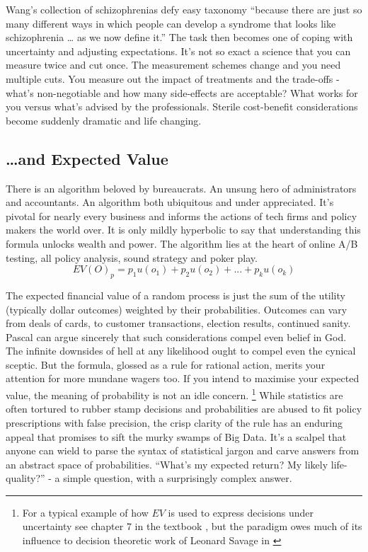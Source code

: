 \documentclass[
]{book}
\theoremstyle{definition}
\theoremstyle{definition}
\theoremstyle{definition}
\theoremstyle{remark}
\begin{document}
Wang's collection of schizophrenias defy easy taxonomy ``because there are just so many different ways in which people can develop a syndrome that looks like schizophrenia \ldots{} as we now define it.'' The task then becomes one of coping with uncertainty and adjusting expectations. It's not so exact a science that you can measure twice and cut once. The measurement schemes change and you need multiple cuts. You measure out the impact of treatments and the trade-offs - what's non-negotiable and how many side-effects are acceptable? What works for you versus what's advised by the professionals. Sterile cost-benefit considerations become suddenly dramatic and life changing.

\hypertarget{and-expected-value}{%
\subsection{\ldots and Expected Value}\label{and-expected-value}}

There is an algorithm beloved by bureaucrats. An unsung hero of administrators and accountants. An algorithm both ubiquitous and under appreciated. It's pivotal for nearly every business and informs the actions of tech firms and policy makers the world over. It is only mildly hyperbolic to say that understanding this formula unlocks wealth and power. The algorithm lies at the heart of online A/B testing, all policy analysis, sound strategy and poker play. \[ EV(O)_{p} = p_{1}u(o_{1}) + p_{2}u(o_{2}) + ... + p_{k}u(o_{k}) \]

The expected financial value of a random process is just the sum of the utility (typically dollar outcomes) weighted by their probabilities. Outcomes can vary from deals of cards, to customer transactions, election results, continued sanity. Pascal can argue sincerely that such considerations compel even belief in God. The infinite downsides of hell at any likelihood ought to compel even the cynical sceptic. But the formula, glossed as a rule for rational action, merits your attention for more mundane wagers too. If you intend to maximise your expected value, the meaning of probability is not an idle concern. \footnote{For a typical example of how \(EV\) is used to express decisions under uncertainty see chapter 7 in the textbook \citep{BarberBR_ML}, but the paradigm owes much of its influence to decision theoretic work of Leonard Savage in \citep{savage54}} While statistics are often tortured to rubber stamp decisions and probabilities are abused to fit policy prescriptions with false precision, the crisp clarity of the rule has an enduring appeal that promises to sift the murky swamps of Big Data. It's a scalpel that anyone can wield to parse the syntax of statistical jargon and carve answers from an abstract space of probabilities. ``What's my expected return? My likely life-quality?'' - a simple question, with a surprisingly complex answer.
\end{document}
